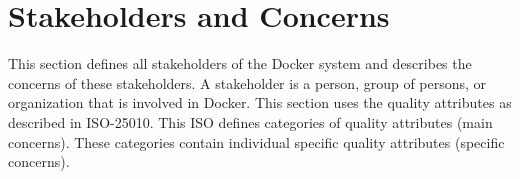 
\clearpage
\chapter{Stakeholders and Concerns}
\label{ch:stakeholders}
This section defines all stakeholders of the Docker system and describes the concerns of these stakeholders. A stakeholder is a person, group of persons, or organization that is involved in Docker. This section uses the quality attributes as described in ISO-25010\cite{iso25010}. This ISO defines categories of quality attributes (main concerns). These categories contain individual specific quality attributes (specific concerns).


%



